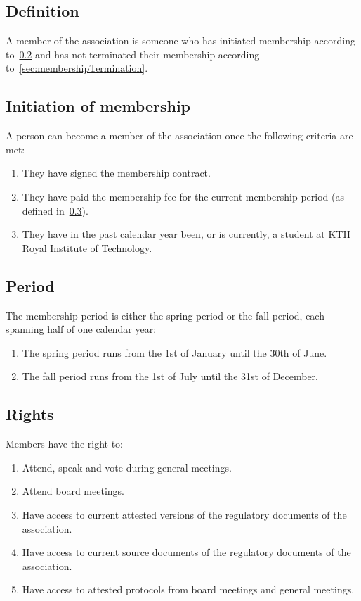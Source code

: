 \subsection{Definition}
A member of the association is someone who has initiated membership according to~\ref{sec:membershipInitiation} 
and has not terminated their membership according to~\ref{sec:membershipTermination}.

\subsection{Initiation of membership}\label{sec:membershipInitiation}
A person can become a member of the association once the following criteria are met:
\begin{enumerate}
  \item They have signed the membership contract. %
  \item They have paid the membership fee for the current membership period (as defined in~\ref{sec:membershipPeriod}).
  \item They have in the past calendar year been, or is currently, a student at KTH Royal Institute of Technology. %
\end{enumerate}

\subsection{Period} \label{sec:membershipPeriod}
The membership period is either the spring period or the fall period, each spanning half of one calendar year:

\begin{enumerate}
  \item The spring period runs from the 1st of January until the 30th of June.
  \item The fall period runs from the 1st of July until the 31st of December.
\end{enumerate}

\subsection{Rights}
Members have the right to: 
\begin{enumerate}
  \item Attend, speak and vote during general meetings.
  \item Attend board meetings.
  \item Have access to current attested versions of the regulatory documents of the association.
  \item Have access to current source documents of the regulatory documents of the association.
  \item Have access to attested protocols from board meetings and general meetings.
\end{enumerate}

